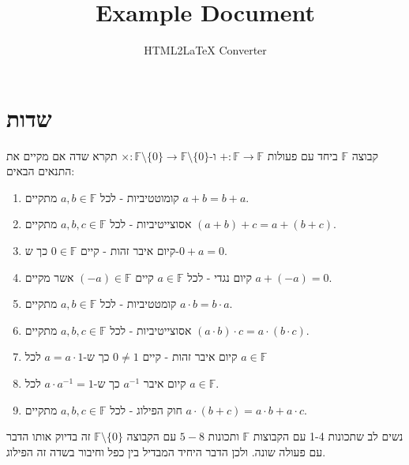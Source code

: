 \documentclass{tstextbook}
\begin{document}
\title{Example Document}
\author{HTML2LaTeX Converter}
\maketitle


\section{שדות}

\begin{definition}[שדה]
קבוצה \(\mathbb{F}\) ביחד עם פעולות \(+:\mathbb{F} \to \mathbb{F}\) ו-\(\times:\mathbb{F} \setminus \{ 0 \}\to \mathbb{F} \setminus \{ 0 \}\) תקרא שדה אם מקיים את התנאים הבאים:

  \begin{enumerate}
    \item קומוטטיביות - לכל \(a,b \in \mathbb{F}\) מתקיים \(a+b=b+a\). 


    \item אסוצייטיביות - לכל \(a,b,c \in \mathbb{F}\) מתקיים \((a+b)+c=a+(b+c)\). 


    \item קיום איבר זהות - קיים \(0 \in \mathbb{F}\) כך ש-\(0+a=0\). 


    \item קיום נגדי - לכל \(a \in \mathbb{F}\) קיים \((-a) \in \mathbb{F}\) אשר מקיים \(a+(-a)=0\). 


    \item קומטטיביות - לכל \(a,b \in \mathbb{F}\) מתקיים \(a\cdot b=b\cdot a\). 


    \item אסוצייטיביות - לכל \(a,b,c \in \mathbb{F}\) מתקיים \(\left( a\cdot b \right)\cdot c=a\cdot\left( b\cdot c \right)\). 


    \item קיום איבר זהות - קיים \(0\neq 1\) כך ש-\(a=a\cdot 1\) לכל \(a \in \mathbb{F}\)


    \item קיום איבר \(a^{-1}\) כך ש-\(a\cdot a ^{-1}= 1\) לכל \(a \in \mathbb{F}\). 


    \item חוק הפילוג - לכל \(a,b,c \in \mathbb{F}\) מתקיים \(a\cdot(b+c)=a\cdot b+a\cdot c\). 


  \end{enumerate}
\end{definition}
\begin{remark}
נשים לב שתכונות 1-4 עם הקבוצות \(\mathbb{F}\) ותכונות \(5-8\) עם הקבוצה \(\mathbb{F} \setminus \{ 0 \}\) זה בדיוק אותו הדבר עם פעולה שונה. ולכן הדבר היחיד המבדיל בין כפל וחיבור בשדה זה הפילוג.

\end{remark}
\end{document}
